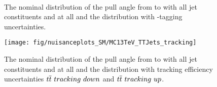 \begin{description}
  \begin{figure}[hbtp]
  \def\twidth{0.45}
  \centering
  \hfil
  \\
 \hfil
  \caption{The nominal distribution of the pull angle from \leadingjet to \scndleadingjet with all jet constituents and at all \DeltaR and the distribution with \cPqb-tagging uncertainties.}
  \label{fig:MC13TeV_TTJets_btag_csv}

\end{figure}

\begin{figure}[hbtp]
\centering
\def\twidth{0.45}
\texttt{[image: fig/nuisanceplots\_SM/MC13TeV\_TTJets\_tracking]}
\caption{The nominal distribution of the pull angle from \leadingjet to \scndleadingjet with all jet constituents and at all \DeltaR and the distribution with tracking efficiency uncertainties $\ttbar\ tracking\ down$ and $\ttbar\ tracking\ up$.}
\label{fig:MC13TeV_TTJets_tracking}
\end{figure}

\end{description}
\clearpage
